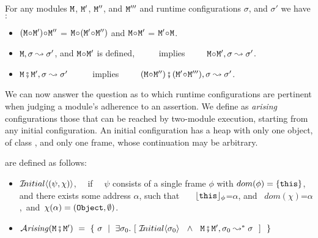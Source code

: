 \begin{lemma}
 For any modules $\M$,   $\M'$, $\M''$, and $\M'''$ and runtime configurations $\sigma$, and $\sigma'$ we have$:$
 \label{lemma:linking:properties}

 \begin{itemize}
     \item
     $(\M \link \M')\link \M''$ = $\M \link (\M' \link \M'')$  \hspace{1cm} and    \hspace{1cm}   $\M \link \M'$  = $\M' \link\M$.
      \item
      $\M, \sigma \leadsto \sigma'$, and $\M\link \M'$ is defined, \  \ \ \ \  implies\ \ \ \ \   $\M\link \M', \sigma \leadsto \sigma'$.
 \item
 $\M \mkpair \M', \sigma \leadsto \sigma'$   \  \ \ \ \  implies\ \ \ \ \  $(\M\link\M'') \mkpair (\M'\link\M''') ,\sigma \leadsto \sigma'$.  
  \end{itemize}

 \end{lemma}
 
 We can now answer the question as to which runtime configurations are pertinent when judging a module's
adherence to an assertion.
We define as  {\em arising} configurations those that can be reached by two-module execution, starting from any initial configuration.
An initial configuration has a heap with only one object, of class , and only one frame, whose continuation may be arbitrary.
 
\begin{definition} are defined as follows: \label{defn:iniial-and-arising}

\begin{itemize}
     \item
   $\Initial {(\psi,\chi)}$, \ \ if \ \ $\psi$ consists of a single frame $\phi$ with $dom(\phi)=\{ \this \}$, and there exists  some address $\alpha$, such that \ \ \    $\interp {\this}{\phi}$=$\alpha$, and \ $dom(\chi)$=$\alpha$,\  and\  
    $\chi(\alpha)=(\prg{Object},\emptyset)$.
 \item
 $\Arising  {\M\mkpair\M'} \ = \ \{ \ \sigma \ \mid \ \exists \sigma_0. \ [\  \Initial{\sigma_0} \  \ \wedge\ \  \M\mkpair\M', \sigma_0 \leadsto^* \sigma \ \ ] \ \ \} $
 \end{itemize}

\end{definition}
